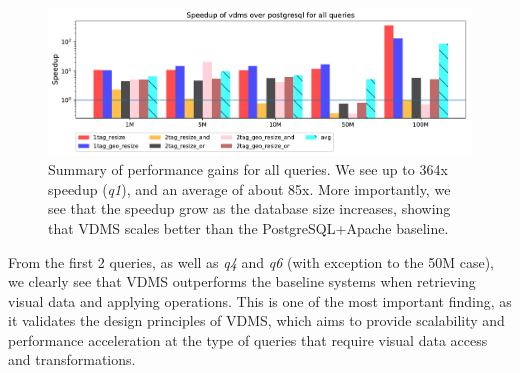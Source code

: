 \begin{figure}[ht!]
\centering
\includegraphics[width=\textwidth]{figures/plot_th_56_query_times_speedup_postgresql}
\caption{Summary of performance gains for all queries.
We see up to 364x speedup (\textit{q1}), and an average of about 85x.
More importantly, we see that the speedup grow as the database size increases,
showing that VDMS scales better than the PostgreSQL+Apache baseline.}
\label{fig:summary_postgresql}
\end{figure}

From the first 2 queries, as well as \textit{q4} and
\textit{q6} (with exception to the 50M case),
we clearly see that VDMS outperforms the baseline systems
when retrieving visual data and applying operations.
This is one of the most important finding, as it validates the design principles
of VDMS, which aims to provide scalability and performance acceleration
at the type of queries that require visual data access and transformations.



